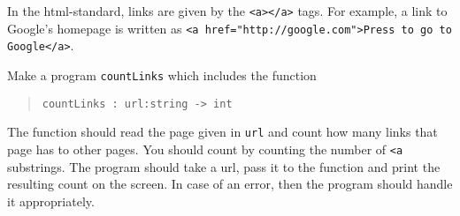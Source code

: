 In the html-standard, links are given by the \lstinline!<a></a>! tags. For example, a link to Google's homepage is written as \lstinline[language=console]!<a href="http://google.com">Press to go to Google</a>!.

Make a program \lstinline[language=console]{countLinks} which includes
the function
\begin{quote}
  \mbox{\lstinline!countLinks : url:string -> int!}
\end{quote}
The function should read the page given in \lstinline!url! and count
how many links that page has to other pages. You should count by
counting the number of \lstinline!<a! substrings. The program should
take a url, pass it to the function and print the resulting count on
the screen. In case of an error, then the program should handle it
appropriately.


